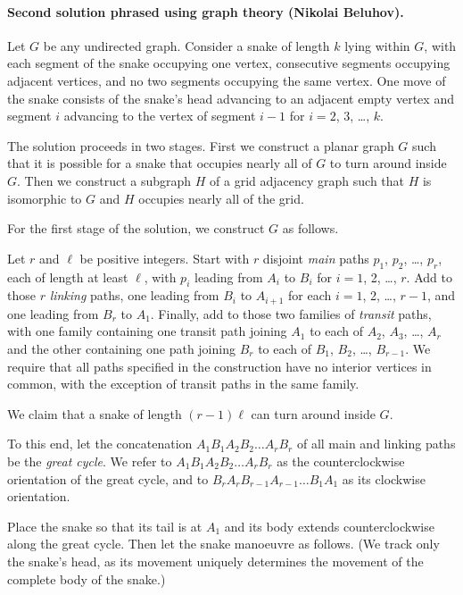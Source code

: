 \documentclass[11pt]{scrartcl}
\begin{document}
\paragraph{Second solution phrased using graph theory (Nikolai Beluhov).}
Let $G$ be any undirected graph. Consider a snake of length $k$ lying within $G$, with each segment of the snake occupying one vertex, consecutive segments occupying adjacent vertices, and no two segments occupying the same vertex. One move of the snake consists of the snake's head advancing to an adjacent empty vertex and segment $i$ advancing to the vertex of segment $i - 1$ for $i = 2$, 3, \dots, $k$.

The solution proceeds in two stages. First we construct a planar graph $G$ such that it is possible for a snake that occupies nearly all of $G$ to turn around inside $G$. Then we construct a subgraph $H$ of a grid adjacency graph such that $H$ is isomorphic to $G$ and $H$ occupies nearly all of the grid.

For the first stage of the solution, we construct $G$ as follows.

Let $r$ and $\ell$ be positive integers. Start with $r$ disjoint \emph{main} paths $p_1$, $p_2$, \dots, $p_r$, each of length at least $\ell$, with $p_i$ leading from $A_i$ to $B_i$ for $i = 1$, 2, \dots, $r$. Add to those $r$ \emph{linking} paths, one leading from $B_i$ to $A_{i + 1}$ for each $i = 1$, 2, \dots, $r - 1$, and one leading from $B_r$ to $A_1$. Finally, add to those two families of \emph{transit} paths, with one family containing one transit path joining $A_1$ to each of $A_2$, $A_3$, \dots, $A_r$ and the other containing one path joining $B_r$ to each of $B_1$, $B_2$, \dots, $B_{r - 1}$. We require that all paths specified in the construction have no interior vertices in common, with the exception of transit paths in the same family.

We claim that a snake of length $(r - 1)\ell$ can turn around inside $G$.

To this end, let the concatenation $A_1B_1A_2B_2\dots A_r B_r$ of all main and linking paths be the \emph{great cycle}. We refer to $A_1B_1A_2B_2\dots A_r B_r$ as the counterclockwise orientation of the great cycle, and to $B_r A_r B_{r - 1}A_{r - 1}\dots B_1A_1$ as its clockwise orientation.

Place the snake so that its tail is at $A_1$ and its body extends counterclockwise along the great cycle. Then let the snake manoeuvre as follows. (We track only the snake's head, as its movement uniquely determines the movement of the complete body of the snake.)
\end{document}
